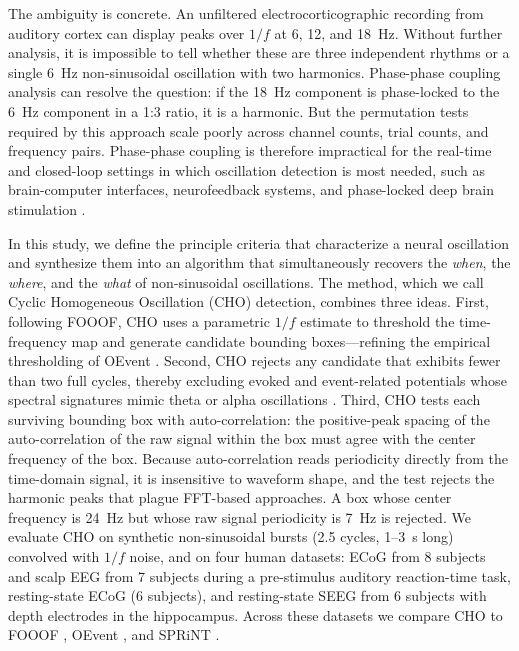 \documentclass[11pt]{article}
\begin{document}
The ambiguity is concrete. An unfiltered electrocorticographic recording from auditory cortex can display peaks over $1/f$ at 6, 12, and 18~Hz. Without further analysis, it is impossible to tell whether these are three independent rhythms or a single 6~Hz non-sinusoidal oscillation with two harmonics. Phase-phase coupling analysis \citep{belluscio2012crossfrequency} can resolve the question: if the 18~Hz component is phase-locked to the 6~Hz component in a 1:3 ratio, it is a harmonic. But the permutation tests required by this approach scale poorly across channel counts, trial counts, and frequency pairs. Phase-phase coupling is therefore impractical for the real-time and closed-loop settings in which oscillation detection is most needed, such as brain-computer interfaces, neurofeedback systems, and phase-locked deep brain stimulation \citep{cagnan2017phase,schalk2004bci2000}.

In this study, we define the principle criteria that characterize a neural oscillation and synthesize them into an algorithm that simultaneously recovers the \emph{when}, the \emph{where}, and the \emph{what} of non-sinusoidal oscillations. The method, which we call Cyclic Homogeneous Oscillation (CHO) detection, combines three ideas. First, following FOOOF, CHO uses a parametric $1/f$ estimate to threshold the time-frequency map and generate candidate bounding boxes---refining the empirical thresholding of OEvent \citep{neymotin2022oevent}. Second, CHO rejects any candidate that exhibits fewer than two full cycles, thereby excluding evoked and event-related potentials whose spectral signatures mimic theta or alpha oscillations \citep{decheveigne2019filters}. Third, CHO tests each surviving bounding box with auto-correlation: the positive-peak spacing of the auto-correlation of the raw signal within the box must agree with the center frequency of the box. Because auto-correlation reads periodicity directly from the time-domain signal, it is insensitive to waveform shape, and the test rejects the harmonic peaks that plague FFT-based approaches. A box whose center frequency is 24~Hz but whose raw signal periodicity is 7~Hz is rejected. We evaluate CHO on synthetic non-sinusoidal bursts (2.5 cycles, 1--3~s long) convolved with $1/f$ noise, and on four human datasets: ECoG from 8 subjects and scalp EEG from 7 subjects during a pre-stimulus auditory reaction-time task, resting-state ECoG (6 subjects), and resting-state SEEG from 6 subjects with depth electrodes in the hippocampus. Across these datasets we compare CHO to FOOOF \citep{donoghue2020parameterizing}, OEvent \citep{neymotin2022oevent}, and SPRiNT \citep{wilson2022sprint}.
\end{document}
